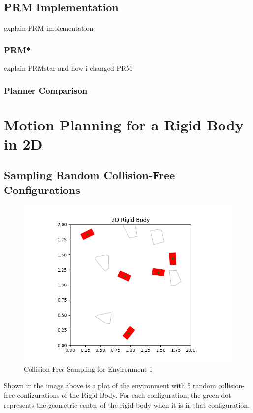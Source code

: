 \documentclass{article}
\begin{document}
\subsection{PRM Implementation}
explain PRM implementation
\subsubsection{PRM*}
explain PRMstar and how i changed PRM
\subsubsection{Planner Comparison}
\maketitle
\section{Motion Planning for a Rigid Body in 2D}
\subsection{Sampling Random Collision-Free Configurations}
\begin{figure}[h!]
	\includegraphics[width= 0.9 \linewidth]{P2_collision_free(1).png}
	\centering
	\caption{Collision-Free Sampling for Environment 1}
	\label{P2_collision_free(1).png}
\end{figure}

Shown in the image above is a plot of the environment with 5 random collision-free configurations of the Rigid Body. For each configuration, the green dot represents the geometric center of the rigid body when it is in that configuration. 
\end{document}
